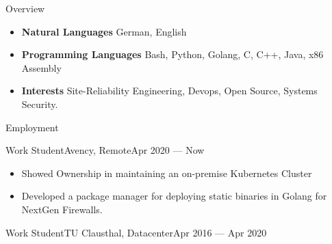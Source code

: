 \documentclass[]{mcdowellcv}
\begin{document}
\makeheader

\begin{cvsection}{Overview}
\begin{cvsubsection}{}{}{}
\begin{itemize}
\item \textbf{Natural Languages} German, English
\item \textbf{Programming Languages} Bash, Python, Golang, C, C++, Java, x86 Assembly
\item \textbf{Interests} Site-Reliability Engineering, Devops, Open Source, Systems Security.
\end{itemize}
\end{cvsubsection}
\end{cvsection}


\begin{cvsection}{Employment}
\begin{cvsubsection}{Work Student}{Avency, Remote}{Apr 2020 --- Now}
\begin{itemize}
\item Showed Ownership in maintaining an on-premise Kubernetes Cluster
\item Developed a package manager for deploying static binaries in Golang for NextGen Firewalls.
\end{itemize}
\end{cvsubsection}
\begin{cvsubsection}{Work Student}{TU Clausthal, Datacenter}{Apr 2016 --- Apr 2020}


\end{cvsubsection}
\end{cvsection}
\end{document}
